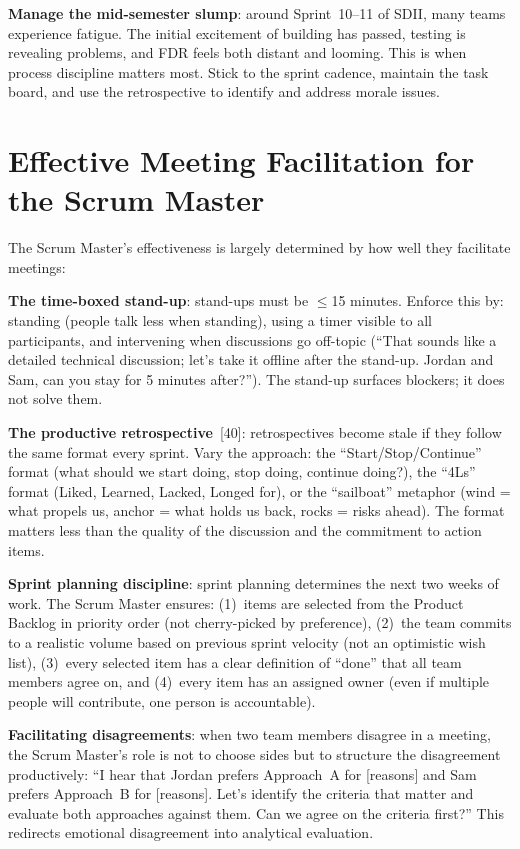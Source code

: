 \textbf{Manage the mid-semester slump}: around Sprint~10--11 of SDII, many teams experience fatigue. The initial excitement of building has passed, testing is revealing problems, and FDR feels both distant and looming. This is when process discipline matters most. Stick to the sprint cadence, maintain the task board, and use the retrospective to identify and address morale issues.



\section{Effective Meeting Facilitation for the Scrum Master}
The Scrum Master's effectiveness is largely determined by how well they facilitate meetings:

\textbf{The time-boxed stand-up}: stand-ups must be $\leq$15 minutes. Enforce this by: standing (people talk less when standing), using a timer visible to all participants, and intervening when discussions go off-topic (``That sounds like a detailed technical discussion; let's take it offline after the stand-up. Jordan and Sam, can you stay for 5 minutes after?''). The stand-up surfaces blockers; it does not solve them.

\textbf{The productive retrospective}~[40]: retrospectives become stale if they follow the same format every sprint. Vary the approach: the ``Start/Stop/Continue'' format (what should we start doing, stop doing, continue doing?), the ``4Ls'' format (Liked, Learned, Lacked, Longed for), or the ``sailboat'' metaphor (wind = what propels us, anchor = what holds us back, rocks = risks ahead). The format matters less than the quality of the discussion and the commitment to action items.

\textbf{Sprint planning discipline}: sprint planning determines the next two weeks of work. The Scrum Master ensures: (1)~items are selected from the Product Backlog in priority order (not cherry-picked by preference), (2)~the team commits to a realistic volume based on previous sprint velocity (not an optimistic wish list), (3)~every selected item has a clear definition of ``done'' that all team members agree on, and (4)~every item has an assigned owner (even if multiple people will contribute, one person is accountable).

\textbf{Facilitating disagreements}: when two team members disagree in a meeting, the Scrum Master's role is not to choose sides but to structure the disagreement productively: ``I hear that Jordan prefers Approach~A for [reasons] and Sam prefers Approach~B for [reasons]. Let's identify the criteria that matter and evaluate both approaches against them. Can we agree on the criteria first?'' This redirects emotional disagreement into analytical evaluation.




